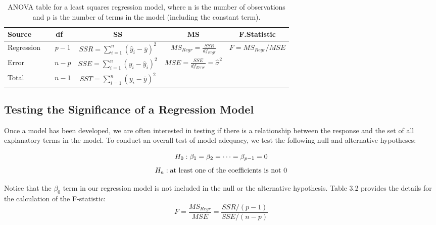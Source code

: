 \documentclass[
]{book}
\begin{document}
\begin{table}

\caption{\label{tab:anovatable} ANOVA table for a least squares regression model, where n is the number of observations and p is the number of terms in the model (including the constant term).}
\centering
\begin{tabular}[t]{l|c|c|c|c}
\hline
Source & df & SS & MS & F.Statistic\\
\hline
Regression & $\quad p - 1$ & $\displaystyle SSR = \sum_{i=1}^n (\hat{y}_i - \bar{y})^2$ & $MS_{Regr} = \tfrac{SSR}{df_{Regr}}$ & $F = MS_{Regr}/MSE$\\
\hline
Error & $\quad n - p$ & $\displaystyle SSE = \sum_{i=1}^n (y_i - \hat{y}_i)^2$ & $MSE = \tfrac{SSE}{df_{Error}} = \hat{\sigma}^2$ & \\
\hline
Total & $\quad n - 1$ & $\displaystyle SST = \sum_{i=1}^n (y_i - \bar{y})^2$ &  & \\
\hline
\end{tabular}
\end{table}

\hypertarget{testing-the-significance-of-a-regression-model}{%
\subsection*{Testing the Significance of a Regression Model}\label{testing-the-significance-of-a-regression-model}}

Once a model has been developed, we are often interested in testing if there is a relationship between the response and the set of all explanatory terms in the model. To conduct an overall test of model adequacy, we test the following null and alternative hypotheses:

\begin{equation}
H_0: \beta_1 = \beta_2 = \dots = \beta_{p-1} = 0 
\notag
\end{equation}
\begin{equation}
H_a: \text{at least one of the coefficients is not }0 
\notag
\end{equation}

Notice that the \(\beta_0\) term in our regression model is not included in the null or the alternative hypothesis. Table 3.2 provides the details for the calculation of the F-statistic:
\begin{equation}
F = \frac{MS_{Regr}}{MSE}
  = \frac{SSR/(p - 1)}{SSE/(n - p)}
\tag{3.11}
\end{equation}
\end{document}
